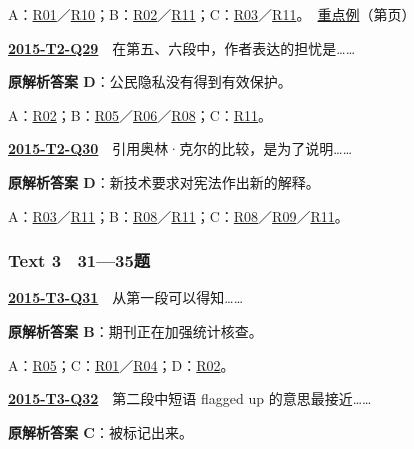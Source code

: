 \documentclass[11pt,a4paper]{article}
\begin{document}
\noindent A：\hyperref[cat-R01]{R01}／\hyperref[cat-R10]{R10}；B：\hyperref[cat-R02]{R02}／\hyperref[cat-R11]{R11}；C：\hyperref[cat-R03]{R03}／\hyperref[cat-R11]{R11}。　\hyperref[case-2015-T2-Q28]{重点例}（第\pageref{case-2015-T2-Q28}页）\par\smallskip
{}\label{idx-2015-T2-Q29}\noindent\textbf{\href{https://zj139.github.io/math-notes/english/1d136f1c0a2cc3e255b39ab4/\#q29}{2015-T2-Q29}}　在第五、六段中，作者表达的担忧是……\par\nopagebreak
\noindent\textbf{原解析答案 D}：公民隐私没有得到有效保护。\par\nopagebreak
\noindent A：\hyperref[cat-R02]{R02}；B：\hyperref[cat-R05]{R05}／\hyperref[cat-R06]{R06}／\hyperref[cat-R08]{R08}；C：\hyperref[cat-R11]{R11}。\par\smallskip
{}\label{idx-2015-T2-Q30}\noindent\textbf{\href{https://zj139.github.io/math-notes/english/1d136f1c0a2cc3e255b39ab4/\#q30}{2015-T2-Q30}}　引用奥林·克尔的比较，是为了说明……\par\nopagebreak
\noindent\textbf{原解析答案 D}：新技术要求对宪法作出新的解释。\par\nopagebreak
\noindent A：\hyperref[cat-R03]{R03}／\hyperref[cat-R11]{R11}；B：\hyperref[cat-R08]{R08}／\hyperref[cat-R11]{R11}；C：\hyperref[cat-R08]{R08}／\hyperref[cat-R09]{R09}／\hyperref[cat-R11]{R11}。\par\smallskip
\clearpage
{}\subsubsection{Text 3　31—35题}
\label{idx-2015-T3-Q31}\noindent\textbf{\href{https://zj139.github.io/math-notes/english/0830618620ce5f72f771a130/\#q31}{2015-T3-Q31}}　从第一段可以得知……\par\nopagebreak
\noindent\textbf{原解析答案 B}：期刊正在加强统计核查。\par\nopagebreak
\noindent A：\hyperref[cat-R05]{R05}；C：\hyperref[cat-R01]{R01}／\hyperref[cat-R04]{R04}；D：\hyperref[cat-R02]{R02}。\par\smallskip
{}\label{idx-2015-T3-Q32}\noindent\textbf{\href{https://zj139.github.io/math-notes/english/0830618620ce5f72f771a130/\#q32}{2015-T3-Q32}}　第二段中短语 flagged up 的意思最接近……\par\nopagebreak
\noindent\textbf{原解析答案 C}：被标记出来。\par\nopagebreak
\end{document}
